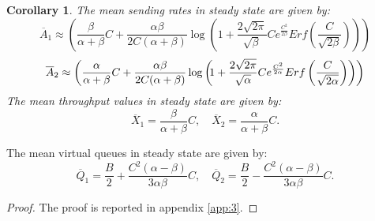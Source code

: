 \documentclass[a4paper,oneside, 11pt]{article}
\newtheorem{cor}[theorem]{Corollary}
\begin{document}
\begin{cor}\label{cor:SQF}
The \textit{mean sending rates} in steady state are given by:
$$ \overline{A}_1\approx\left(\frac{\beta}{\alpha+\beta}C+\frac{\alpha\beta}{2C(\alpha+\beta)}\log\left(1+\frac{2\sqrt{2\pi}}{\sqrt{\beta}}C e^{\frac{C^2}{2\beta}}Erf\left(\frac{C}{\sqrt{2\beta}}\right)\right)\right)$$
$$\overline{A}_2\approx\left(\frac{\alpha}{\alpha+\beta}C+\frac{\alpha\beta}{2C(\alpha+\beta)}\log\left(\hspace{-1mm}1+\frac{2\sqrt{2\pi}}{\sqrt{\alpha}}C e^{\frac{C^2}{2\alpha}}Erf\left(\frac{C}{\sqrt{2\alpha}}\right)\right)\right)$$
The \textit{mean throughput values} in steady state are given by:
$$ \overline{X}_1=\frac{\beta}{\alpha+\beta}C,\quad \overline{X}_2=\frac{\alpha}{\alpha+\beta}C.$$
\end{cor}
The mean virtual queues in steady state are given by:
$$ \overline{Q}_1=\frac{B}{2}+\frac{C^2(\alpha-\beta)}{3\alpha\beta}C,\quad \overline{Q}_2=\frac{B}{2}-\frac{C^2(\alpha-\beta)}{3\alpha\beta}C.$$
\begin{proof}
The proof is reported in appendix \ref{app:3}.
\end{proof}
\end{document}
